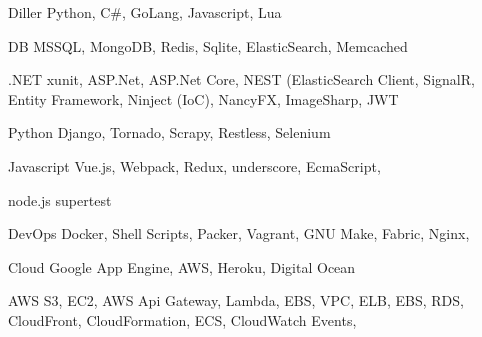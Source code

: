 

\begin{cvskills}



  \cvskill
    {Diller} %
    { Python, C\#, GoLang, Javascript, Lua } %

  
  \cvskill
    {DB}
    { MSSQL, MongoDB, Redis, Sqlite, ElasticSearch, Memcached}
    
  \cvskill
    {.NET}
    { xunit, ASP.Net, ASP.Net Core, NEST (ElasticSearch Client, SignalR, Entity Framework, Ninject (IoC), NancyFX, ImageSharp, JWT }

  \cvskill
    {Python}
    { Django, Tornado, Scrapy, Restless, Selenium }

  \cvskill
    {Javascript}
    { Vue.js, Webpack, Redux, underscore, EcmaScript, }

  \cvskill
    {node.js}
    { supertest }

  \cvskill
    {DevOps}
    { Docker, Shell Scripts, Packer, Vagrant, GNU Make, Fabric, Nginx, }

  \cvskill
    {Cloud}
    { Google App Engine, AWS, Heroku, Digital Ocean}
  
  \cvskill
    {AWS}
    { S3, EC2, AWS Api Gateway, Lambda, EBS, VPC, ELB, EBS, RDS, CloudFront, CloudFormation, ECS, CloudWatch Events, }
         
\end{cvskills}



